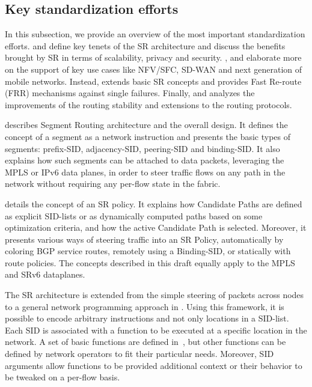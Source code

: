 \subsection{Key standardization efforts}
In this subsection, we provide an overview of the most important standardization efforts. \cite{rfc8402} and \cite{id-segment-routing-policy} define key tenets of the SR architecture and discuss the benefits brought by SR in terms of scalability, privacy and security. \cite{id-sr-service-programming}, \cite{id-sr-for-sdwan} and  \cite{id-srv6-mobile-uplane} elaborate more on the support of key use cases like NFV/SFC, SD-WAN and next generation of mobile networks. Instead, \cite{id-srv6-network-prog} extends basic SR concepts and \cite{id-segment-routing-ti-lfa} provides Fast Re-route (FRR) mechanisms against single failures. Finally,  
\cite{id-segment-routing-uloop} and \cite{ietf-lsr-flex-algo-00} analyzes the improvements of the routing stability and extensions to the routing protocols.

\cite{rfc8402} describes Segment Routing architecture and the overall design. It defines the concept of a segment as a network instruction and presents the basic types of segments: prefix-SID, adjacency-SID, peering-SID and binding-SID. It also explains how such segments can be attached to data packets, leveraging the MPLS or IPv6 data planes, in order to steer traffic flows on any path in the network without requiring any per-flow state in the fabric.

\cite{id-segment-routing-policy} details the concept of an SR policy. It explains how Candidate Paths are defined as explicit SID-lists or as dynamically computed paths based on some optimization criteria, and how the active Candidate Path is selected. Moreover, it presents various ways of steering traffic into an SR Policy, automatically by coloring BGP service routes, remotely using a Binding-SID, or statically with route policies. The concepts described in this draft equally apply to the MPLS and SRv6 dataplanes.

The SR architecture is extended from the simple steering of packets across nodes to a general network programming approach in \cite{id-srv6-network-prog}. Using this framework, it is possible to encode arbitrary instructions and not only locations in a SID-list. Each SID is associated with a function to be executed at a specific location in the network. A set of basic functions are defined in~\cite{id-srv6-network-prog}, but other functions can be defined by network operators to fit their particular needs. Moreover, SID arguments allow functions to be provided additional context or their behavior to be tweaked on a per-flow basis.

